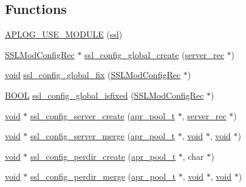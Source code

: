 \subsection*{Functions}
\begin{DoxyCompactItemize}
\item 
\hyperlink{group__MOD__SSL__PRIVATE_gae94904a2a14f4484c7435891ecae3a6c}{A\+P\+L\+O\+G\+\_\+\+U\+S\+E\+\_\+\+M\+O\+D\+U\+LE} (\hyperlink{group__MOD__SSL_ga91d808d6c1c01029f9c9260b9b69a437}{ssl})
\item 
\hyperlink{structSSLModConfigRec}{S\+S\+L\+Mod\+Config\+Rec} $\ast$ \hyperlink{group__MOD__SSL__PRIVATE_ga0365faa903562ac63083df6d04227521}{ssl\+\_\+config\+\_\+global\+\_\+create} (\hyperlink{structserver__rec}{server\+\_\+rec} $\ast$)
\item 
\hyperlink{group__MOD__ISAPI_gacd6cdbf73df3d9eed42fa493d9b621a6}{void} \hyperlink{group__MOD__SSL__PRIVATE_gafe1cfce41c29de1c8980f2a0caa6fe4f}{ssl\+\_\+config\+\_\+global\+\_\+fix} (\hyperlink{structSSLModConfigRec}{S\+S\+L\+Mod\+Config\+Rec} $\ast$)
\item 
\hyperlink{pcre__internal_8h_a050c65e107f0c828f856a231f4b4e788}{B\+O\+OL} \hyperlink{group__MOD__SSL__PRIVATE_ga7b617989eaed8441685c2301ea87044a}{ssl\+\_\+config\+\_\+global\+\_\+isfixed} (\hyperlink{structSSLModConfigRec}{S\+S\+L\+Mod\+Config\+Rec} $\ast$)
\item 
\hyperlink{group__MOD__ISAPI_gacd6cdbf73df3d9eed42fa493d9b621a6}{void} $\ast$ \hyperlink{group__MOD__SSL__PRIVATE_ga64e7868513bbdfcdcecbdb9dfbf185e6}{ssl\+\_\+config\+\_\+server\+\_\+create} (\hyperlink{structapr__pool__t}{apr\+\_\+pool\+\_\+t} $\ast$, \hyperlink{structserver__rec}{server\+\_\+rec} $\ast$)
\item 
\hyperlink{group__MOD__ISAPI_gacd6cdbf73df3d9eed42fa493d9b621a6}{void} $\ast$ \hyperlink{group__MOD__SSL__PRIVATE_gaeb1adecf91162c750ea580b872996f32}{ssl\+\_\+config\+\_\+server\+\_\+merge} (\hyperlink{structapr__pool__t}{apr\+\_\+pool\+\_\+t} $\ast$, \hyperlink{group__MOD__ISAPI_gacd6cdbf73df3d9eed42fa493d9b621a6}{void} $\ast$, \hyperlink{group__MOD__ISAPI_gacd6cdbf73df3d9eed42fa493d9b621a6}{void} $\ast$)
\item 
\hyperlink{group__MOD__ISAPI_gacd6cdbf73df3d9eed42fa493d9b621a6}{void} $\ast$ \hyperlink{group__MOD__SSL__PRIVATE_gac349d01ebf73781e164c581e8a6f25b8}{ssl\+\_\+config\+\_\+perdir\+\_\+create} (\hyperlink{structapr__pool__t}{apr\+\_\+pool\+\_\+t} $\ast$, char $\ast$)
\item 
\hyperlink{group__MOD__ISAPI_gacd6cdbf73df3d9eed42fa493d9b621a6}{void} $\ast$ \hyperlink{group__MOD__SSL__PRIVATE_ga6ad87436d17cf9df9aeb088e9f288871}{ssl\+\_\+config\+\_\+perdir\+\_\+merge} (\hyperlink{structapr__pool__t}{apr\+\_\+pool\+\_\+t} $\ast$, \hyperlink{group__MOD__ISAPI_gacd6cdbf73df3d9eed42fa493d9b621a6}{void} $\ast$, \hyperlink{group__MOD__ISAPI_gacd6cdbf73df3d9eed42fa493d9b621a6}{void} $\ast$)

\end{DoxyCompactItemize}
